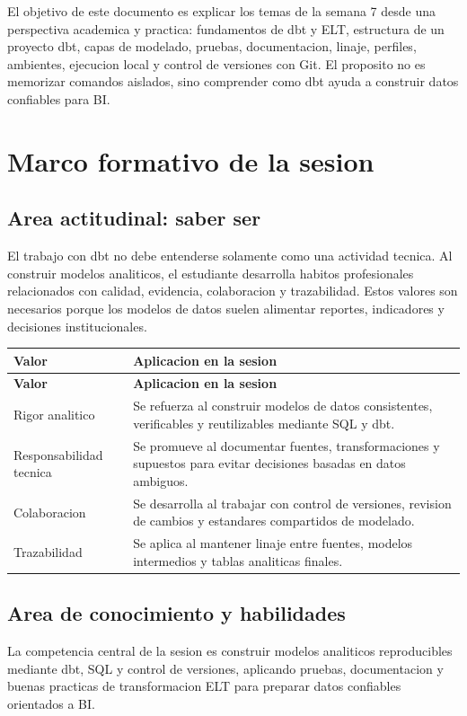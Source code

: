 \documentclass[12pt]{article}
\begin{document}
El objetivo de este documento es explicar los temas de la semana 7 desde una perspectiva academica y practica: fundamentos de dbt y ELT, estructura de un proyecto dbt, capas de modelado, pruebas, documentacion, linaje, perfiles, ambientes, ejecucion local y control de versiones con Git. El proposito no es memorizar comandos aislados, sino comprender como dbt ayuda a construir datos confiables para BI.

\section{Marco formativo de la sesion}
\subsection{Area actitudinal: saber ser}
El trabajo con dbt no debe entenderse solamente como una actividad tecnica. Al construir modelos analiticos, el estudiante desarrolla habitos profesionales relacionados con calidad, evidencia, colaboracion y trazabilidad. Estos valores son necesarios porque los modelos de datos suelen alimentar reportes, indicadores y decisiones institucionales.

\begin{longtable}{@{}p{}p{}@{}}
\toprule
\textbf{Valor} & \textbf{Aplicacion en la sesion} \\
\midrule
\endfirsthead
\toprule
\textbf{Valor} & \textbf{Aplicacion en la sesion} \\
\midrule
\endhead

Rigor analitico & Se refuerza al construir modelos de datos consistentes, verificables y reutilizables mediante SQL y dbt. \\

Responsabilidad tecnica & Se promueve al documentar fuentes, transformaciones y supuestos para evitar decisiones basadas en datos ambiguos. \\

Colaboracion & Se desarrolla al trabajar con control de versiones, revision de cambios y estandares compartidos de modelado. \\

Trazabilidad & Se aplica al mantener linaje entre fuentes, modelos intermedios y tablas analiticas finales. \\

\bottomrule
\end{longtable}

\subsection{Area de conocimiento y habilidades}
La competencia central de la sesion es construir modelos analiticos reproducibles mediante dbt, SQL y control de versiones, aplicando pruebas, documentacion y buenas practicas de transformacion ELT para preparar datos confiables orientados a BI.
\end{document}
